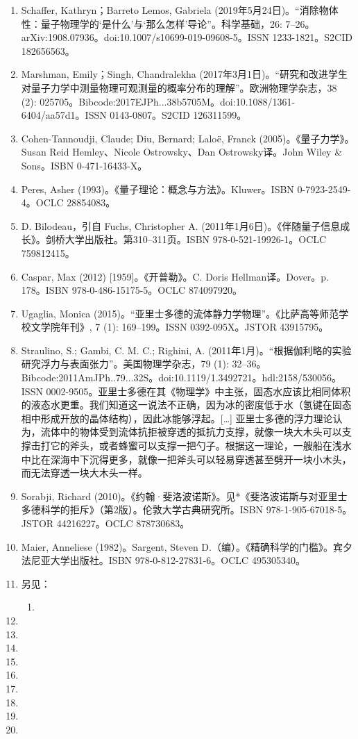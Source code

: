 \begin{enumerate}
\item Schaffer, Kathryn；Barreto Lemos, Gabriela (2019年5月24日)。“消除物体性：量子物理学的‘是什么’与‘那么怎样’导论”。科学基础，26: 7–26。arXiv:1908.07936。doi:10.1007/s10699-019-09608-5。ISSN 1233-1821。S2CID 182656563。
\item Marshman, Emily；Singh, Chandralekha (2017年3月1日)。“研究和改进学生对量子力学中测量物理可观测量的概率分布的理解”。欧洲物理学杂志，38 (2): 025705。Bibcode:2017EJPh...38b5705M。doi:10.1088/1361-6404/aa57d1。ISSN 0143-0807。S2CID 126311599。
\item Cohen-Tannoudji, Claude; Diu, Bernard; Laloë, Franck (2005)。《量子力学》。Susan Reid Hemley、Nicole Ostrowsky、Dan Ostrowsky译。John Wiley & Sons。ISBN 0-471-16433-X。
\item Peres, Asher (1993)。《量子理论：概念与方法》。Kluwer。ISBN 0-7923-2549-4。OCLC 28854083。
\item D. Bilodeau，引自 Fuchs, Christopher A. (2011年1月6日)。《伴随量子信息成长》。剑桥大学出版社。第310–311页。ISBN 978-0-521-19926-1。OCLC 759812415。
\item Caspar, Max (2012) [1959]。《开普勒》。C. Doris Hellman译。Dover。p. 178。ISBN 978-0-486-15175-5。OCLC 874097920。
\item Ugaglia, Monica (2015)。“亚里士多德的流体静力学物理”。《比萨高等师范学校文学院年刊》, 7 (1): 169–199。ISSN 0392-095X。JSTOR 43915795。
\item Straulino, S.; Gambi, C. M. C.; Righini, A. (2011年1月)。“根据伽利略的实验研究浮力与表面张力”。美国物理学杂志，79 (1): 32–36。Bibcode:2011AmJPh..79...32S。doi:10.1119/1.3492721。hdl:2158/530056。ISSN 0002-9505。亚里士多德在其《物理学》中主张，固态水应该比相同体积的液态水更重。我们知道这一说法不正确，因为冰的密度低于水（氢键在固态相中形成开放的晶体结构），因此冰能够浮起。[…] 亚里士多德的浮力理论认为，流体中的物体受到流体抗拒被穿透的抵抗力支撑，就像一块大木头可以支撑击打它的斧头，或者蜂蜜可以支撑一把勺子。根据这一理论，一艘船在浅水中比在深海中下沉得更多，就像一把斧头可以轻易穿透甚至劈开一块小木头，而无法穿透一块大木头一样。
\item Sorabji, Richard (2010)。《约翰·斐洛波诺斯》。见*《斐洛波诺斯与对亚里士多德科学的拒斥》（第2版）。伦敦大学古典研究所。ISBN 978-1-905-67018-5。JSTOR 44216227。OCLC 878730683。
\item Maier, Anneliese (1982)。Sargent, Steven D.（编）。《精确科学的门槛》。宾夕法尼亚大学出版社。ISBN 978-0-812-27831-6。OCLC 495305340。
\item 另见：\begin{enumerate}
\item 
\end{enumerate}
\item 
\item 
\item 
\item 
\item 
\item 
\item 
\item 
\item 

\end{enumerate}